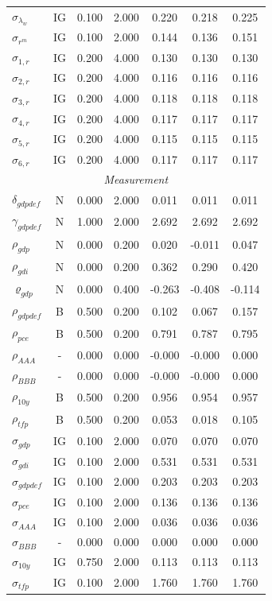 \documentclass[12pt]{article}
\begin{document}
{\begin{longtable}{lcccccc}
$\sigma_{\lambda_w}$ & IG &    0.100 &    2.000 &    0.220 &    0.218 &    0.225 \\
$\sigma_{r^m}$ & IG &    0.100 &    2.000 &    0.144 &    0.136 &    0.151 \\
$\sigma_{1,r}$ & IG &    0.200 &    4.000 &    0.130 &    0.130 &    0.130 \\
$\sigma_{2,r}$ & IG &    0.200 &    4.000 &    0.116 &    0.116 &    0.116 \\
$\sigma_{3,r}$ & IG &    0.200 &    4.000 &    0.118 &    0.118 &    0.118 \\
$\sigma_{4,r}$ & IG &    0.200 &    4.000 &    0.117 &    0.117 &    0.117 \\
$\sigma_{5,r}$ & IG &    0.200 &    4.000 &    0.115 &    0.115 &    0.115 \\
$\sigma_{6,r}$ & IG &    0.200 &    4.000 &    0.117 &    0.117 &    0.117 \\
\multicolumn{7}{c}{\textit{Measurement}} \\[3pt]
$\delta_{gdpdef}$ & N &    0.000 &    2.000 &    0.011 &    0.011 &    0.011 \\
$\gamma_{gdpdef}$ & N &    1.000 &    2.000 &    2.692 &    2.692 &    2.692 \\
$\rho_{gdp}$ & N &    0.000 &    0.200 &    0.020 &   -0.011 &    0.047 \\
$\rho_{gdi}$ & N &    0.000 &    0.200 &    0.362 &    0.290 &    0.420 \\
$\varrho_{gdp}$ & N &    0.000 &    0.400 &   -0.263 &   -0.408 &   -0.114 \\
$\rho_{gdpdef}$ & B &    0.500 &    0.200 &    0.102 &    0.067 &    0.157 \\
$\rho_{pce}$ & B &    0.500 &    0.200 &    0.791 &    0.787 &    0.795 \\
$\rho_{AAA}$ & - &    0.000 &    0.000 &   -0.000 &   -0.000 &    0.000 \\
$\rho_{BBB}$ & - &    0.000 &    0.000 &   -0.000 &   -0.000 &    0.000 \\
$\rho_{10y}$ & B &    0.500 &    0.200 &    0.956 &    0.954 &    0.957 \\
$\rho_{tfp}$ & B &    0.500 &    0.200 &    0.053 &    0.018 &    0.105 \\
$\sigma_{gdp}$ & IG &    0.100 &    2.000 &    0.070 &    0.070 &    0.070 \\
$\sigma_{gdi}$ & IG &    0.100 &    2.000 &    0.531 &    0.531 &    0.531 \\
$\sigma_{gdpdef}$ & IG &    0.100 &    2.000 &    0.203 &    0.203 &    0.203 \\
$\sigma_{pce}$ & IG &    0.100 &    2.000 &    0.136 &    0.136 &    0.136 \\
$\sigma_{AAA}$ & IG &    0.100 &    2.000 &    0.036 &    0.036 &    0.036 \\
$\sigma_{BBB}$ & - &    0.000 &    0.000 &    0.000 &    0.000 &    0.000 \\
$\sigma_{10y}$ & IG &    0.750 &    2.000 &    0.113 &    0.113 &    0.113 \\
$\sigma_{tfp}$ & IG &    0.100 &    2.000 &    1.760 &    1.760 &    1.760 \\
\end{longtable}}
\end{document}
